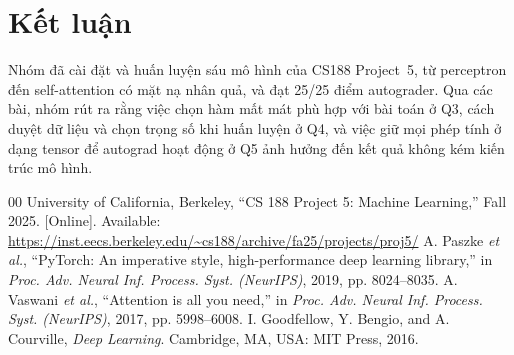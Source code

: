 \documentclass[conference]{IEEEtran}
\begin{document}
\section{Kết luận}
\label{sec:conclusion}
Nhóm đã cài đặt và huấn luyện sáu mô hình của CS188 Project~5, từ perceptron
đến self-attention có mặt nạ nhân quả, và đạt 25/25 điểm autograder. Qua các
bài, nhóm rút ra rằng việc chọn hàm mất mát phù hợp với bài toán ở Q3, cách
duyệt dữ liệu và chọn trọng số khi huấn luyện ở Q4, và việc giữ mọi phép tính ở
dạng tensor để autograd hoạt động ở Q5 ảnh hưởng đến kết quả không kém kiến
trúc mô hình.

\begin{thebibliography}{00}
 University of California, Berkeley, ``CS 188 Project 5:
Machine Learning,'' Fall 2025. [Online]. Available:
\url{https://inst.eecs.berkeley.edu/~cs188/archive/fa25/projects/proj5/}
 A. Paszke \textit{et al.}, ``PyTorch: An imperative style,
high-performance deep learning library,'' in \textit{Proc. Adv. Neural Inf.
Process. Syst. (NeurIPS)}, 2019, pp. 8024--8035.
 A. Vaswani \textit{et al.}, ``Attention is all you need,''
in \textit{Proc. Adv. Neural Inf. Process. Syst. (NeurIPS)}, 2017,
pp. 5998--6008.
 I. Goodfellow, Y. Bengio, and A. Courville, \textit{Deep
Learning}. Cambridge, MA, USA: MIT Press, 2016.
\end{thebibliography}
\end{document}

